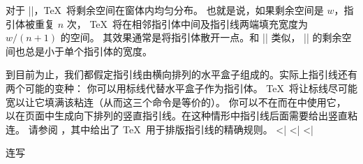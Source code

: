 {{{{{{%
\li 对于 |\xleaders|，\TeX\ 将剩余空间在窗体内均匀分布。
也就是说，如果剩余空间是 $w$，指引体被重复 $n$ 次，
\TeX\ 将在相邻指引体中间及指引线两端填充宽度为 $w/(n+1)$ 的空间。
其效果通常是将指引体散开一点。和 |\cleaders| 类似，
|\xleaders| 的剩余空间也总是小于单个指引体的宽度。
\endulist

到目前为止，我们都假定指引线由横向排列的水平盒子组成的。实际上指引线还有两个可能的变种：
\olist
\li 你可以用标线代替水平盒子作为指引体。
\TeX\ 将让标线尽可能宽以让它填满该粘连（从而这三个命令是等价的）。
\li 你可以不在而在中使用它，
以在页面中生成向下排列的竖直指引线。在这种情形中指引线后面需要给出竖直粘连。
\endolist
\noindent
请参阅 ，其中给出了 \TeX\ 用于排版指引线的精确规则。
\eix^^|\leaders|
\eix^^|\cleaders|
\eix^^|\xleaders|
\endconcept


\concept 连写

}}}}}}
